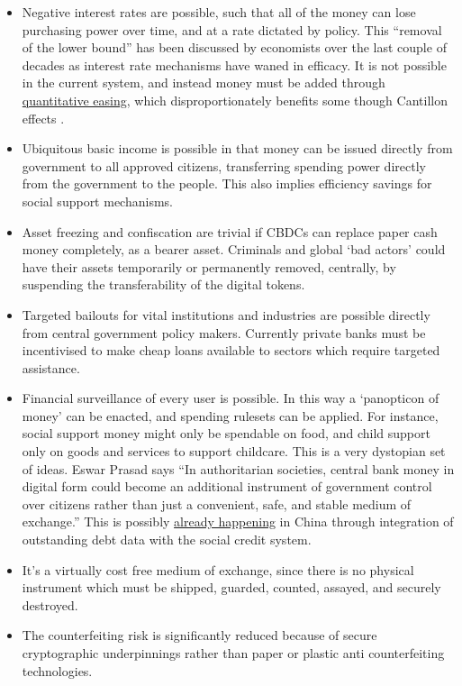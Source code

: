 \begin{itemize}
\item Negative interest rates are possible, such that all of the money can lose purchasing power over time, and at a rate dictated by policy. This ``removal of the lower bound'' has been discussed by economists over the last couple of decades as interest rate mechanisms have waned in efficacy. It is not possible in the current system, and instead money must be added through \href{https://www.bankofengland.co.uk/monetary-policy/quantitative-easing}{quantitative easing}, which disproportionately benefits some though Cantillon effects \cite{cantillon1756essai, bordo1983some}.  
\item Ubiquitous basic income is possible in that money can be issued directly from government to all approved citizens, transferring spending power directly from the government to the people. This also implies efficiency savings for social support mechanisms.
\item Asset freezing and confiscation are trivial if CBDCs can replace paper cash money completely, as a bearer asset. Criminals and global `bad actors' could have their assets temporarily or permanently removed, centrally, by suspending the transferability of the digital tokens.
\item Targeted bailouts for vital institutions and industries are possible directly from central government policy makers. Currently private banks must be incentivised to make cheap loans available to sectors which require targeted assistance.
\item Financial surveillance of every user is possible. In this way a `panopticon of money' can be enacted, and spending rulesets can be applied. For instance, social support money might only be spendable on food, and child support only on goods and services to support childcare. This is a very dystopian set of ideas. Eswar Prasad says ``In authoritarian societies, central bank money in digital form could become an additional instrument of government control over citizens rather than just a convenient, safe, and stable medium of exchange\cite{prasad2021future}.'' This is possibly \href{https://twitter.com/WallStreetSilv/status/1581378124452753408}{already happening} in China through integration of outstanding debt data with the social credit system.  
\item It's a virtually cost free medium of exchange, since there is no physical instrument which must be shipped, guarded, counted, assayed, and securely destroyed.
\item The counterfeiting risk is significantly reduced because of secure cryptographic underpinnings rather than paper or plastic anti counterfeiting technologies.

\end{itemize}
